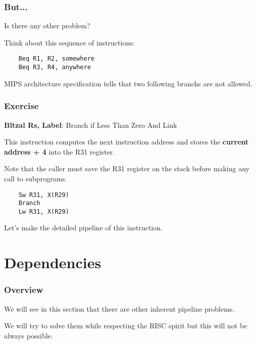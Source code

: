 \begin{frame}[containsverbatim]
  \frametitle{But...}

  Is there any other problem?

  \-

  Think about this sequence of instructions:

  \begin{verbatim}
    Beq R1, R2, somewhere
    Beq R3, R4, anywhere
  \end{verbatim}

  \-

  MIPS architecture specification tells that two following branchs are
  not allowed.
\end{frame}


\begin{frame}[containsverbatim]
  \frametitle{Exercise}

  \textbf{Bltzal Rs, Label}: Branch if Less Than Zero And Link

  \-

  This instruction computes the next instruction address and stores
  the \textbf{current address + 4} into the R31 register.

  \-

  Note that the caller must save the R31 register on the stack before
  making any call to subprograms.

  \begin{verbatim}
    Sw R31, X(R29)
    Branch
    Lw R31, X(R29)
  \end{verbatim}

  \-

  Let's make the detailed pipeline of this instruction.
\end{frame}

%
%

\section{Dependencies}


\begin{frame}
  \frametitle{Overview}

  We will see in this section that there are other inherent pipeline
  problems.

  \-

  We will try to solve them while respecting the RISC spirit but
  this will not be always possible.
\end{frame}

